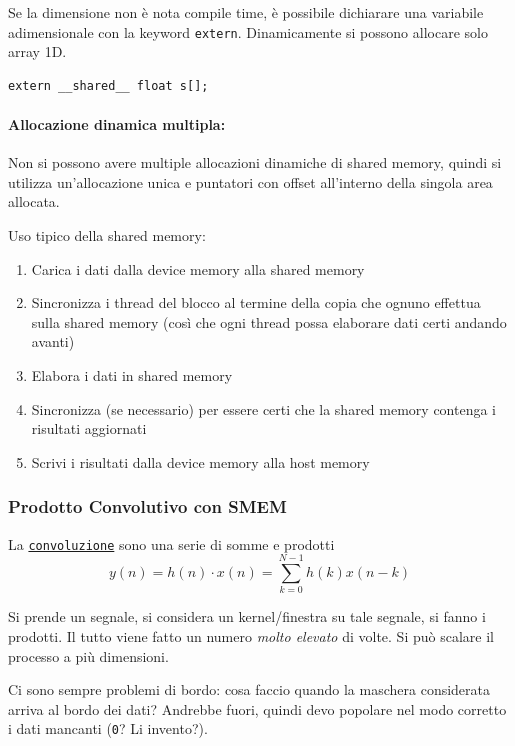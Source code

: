 Se la dimensione non è nota compile time, è possibile dichiarare una variabile adimensionale con la keyword \texttt{extern}. Dinamicamente si possono allocare solo array 1D.
\begin{verbatim}
extern __shared__ float s[];
\end{verbatim}

\paragraph{Allocazione dinamica multipla:} Non si possono avere multiple allocazioni dinamiche di shared memory, quindi si utilizza un'allocazione unica e puntatori con offset all'interno della singola area allocata.

Uso tipico della shared memory:
\begin{enumerate}
	\item Carica i dati dalla device memory alla shared memory
	
	\item Sincronizza i thread del blocco al termine della copia che ognuno effettua sulla shared memory (così che ogni thread possa elaborare dati certi andando avanti)
	
	\item Elabora i dati in shared memory

	\item Sincronizza (se necessario) per essere certi che la shared memory contenga i risultati aggiornati
	
	\item Scrivi i risultati dalla device memory alla host memory
\end{enumerate}

\subsubsection{Prodotto Convolutivo con SMEM}
La \href{https://it.wikipedia.org/wiki/Convoluzione}{\texttt{convoluzione}} sono una serie di somme e prodotti
$$ y(n) = h(n) \cdot x(n) = \sum_{k=0}^{N-1} h(k) x(n-k) $$

Si prende un segnale, si considera un kernel/finestra su tale segnale, si fanno i prodotti. Il tutto viene fatto un numero \textit{molto elevato} di volte. Si può scalare il processo a più dimensioni.

Ci sono sempre problemi di bordo: cosa faccio quando la maschera considerata arriva al bordo dei dati? Andrebbe fuori, quindi devo popolare nel modo corretto i dati mancanti (\texttt{0}? Li invento?).

